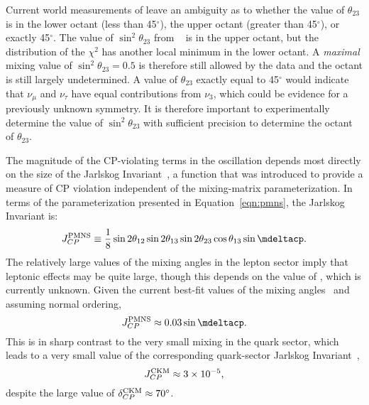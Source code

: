 Current world measurements of  leave an ambiguity as to whether the value of $\theta_{23}$ is in the lower octant (less than 45\mbox{$^{\circ}$}), the upper octant (greater than 45\mbox{$^{\circ}$}), or exactly 45\mbox{$^{\circ}$}.  The value of $\sin^2 \theta_{23}$ from ~\cite{Esteban:2018azc,nufitweb} is in the upper octant, but the distribution of the $\chi^{2}$ has another local minimum in the lower octant. A \emph{maximal} mixing value of $\sin^2 \theta_{23} =0.5$ is therefore still allowed by the data and the octant is still largely undetermined.  A value of
$\theta_{23}$ exactly equal to 45\mbox{$^{\circ}$} would indicate that $\nu_{\mu}$ and $\nu_{\tau}$ have equal contributions from $\nu_3$, which could be evidence for a previously unknown symmetry.  It is therefore important to experimentally determine the value of $\sin ^2
\theta_{23}$ with sufficient precision to determine the octant of $\theta_{23}$.

The magnitude of the
CP-violating terms in the oscillation depends most directly on the
size of the Jarlskog Invariant~\cite{Jarlskog:1985cw}, a function that
was introduced to provide a measure of CP violation independent of the
mixing-matrix parameterization. In terms of the parameterization
presented in Equation~\ref{eqn:pmns}, the Jarlskog Invariant is:
%
\begin{equation}
J_{CP}^{\rm PMNS} \equiv \frac{1}{8} \sin 2 \theta_{12} \sin 2 \theta_{13}
\sin 2 \theta_{23} \cos \theta_{13} \sin \mdeltacp.
\end{equation}
The relatively large values of the mixing angles in the lepton sector imply that
leptonic  effects may be quite large, though this depends on
the value of \deltacp, which is currently unknown. Given the current best-fit values of the mixing angles~\cite{Esteban:2018azc,nufitweb} and assuming normal ordering,
\begin{equation}
J_{CP}^{\rm PMNS} \approx 0.03 \sin \mdeltacp.
\end{equation}
This is in sharp contrast to the very small mixing in the quark sector,  
which leads to a very small value of the corresponding quark-sector
Jarlskog Invariant~\cite{Tanabashi:2018oca}, %
\begin{equation}
J_{CP}^{\rm CKM} \approx 3 \times 10^{-5},
\end{equation}
despite the large value of $\delta^{\rm CKM}_{CP}\approx70^{\circ}$.

